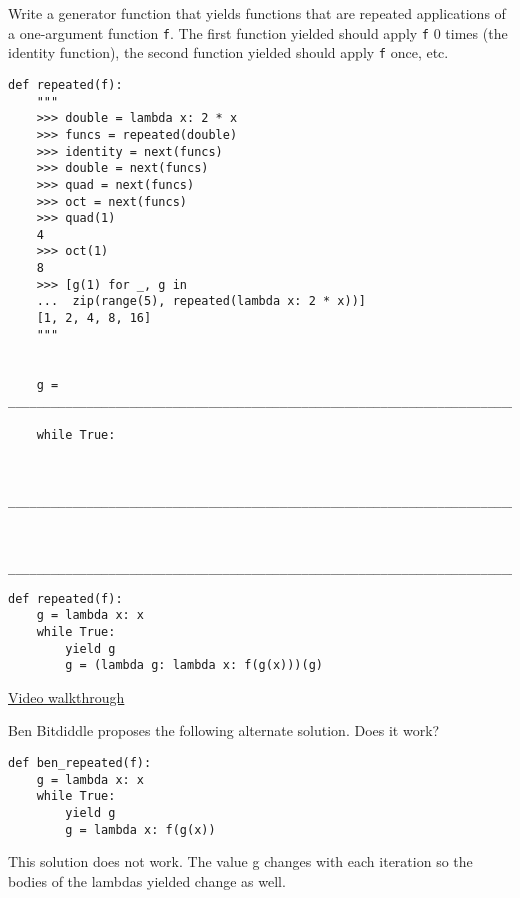 \question Write a generator function that yields functions that are repeated
applications of a one-argument function \texttt{f}. The first function yielded
should apply \texttt{f} 0 times (the identity function), the second function
yielded should apply \texttt{f} once, etc.

\begin{lstlisting}
def repeated(f):
    """
    >>> double = lambda x: 2 * x
    >>> funcs = repeated(double)
    >>> identity = next(funcs)
    >>> double = next(funcs)
    >>> quad = next(funcs)
    >>> oct = next(funcs)
    >>> quad(1)
    4
    >>> oct(1)
    8
    >>> [g(1) for _, g in
    ...  zip(range(5), repeated(lambda x: 2 * x))]
    [1, 2, 4, 8, 16]
    """


    g = ________________________________________________________________________

    while True:


        ________________________________________________________________________


        ________________________________________________________________________
\end{lstlisting}
\begin{solution}
\begin{lstlisting}
def repeated(f):
    g = lambda x: x
    while True:
        yield g
        g = (lambda g: lambda x: f(g(x)))(g)
\end{lstlisting}
\href{https://youtu.be/I-riLb8xAdk}{Video walkthrough}
\end{solution}

\question Ben Bitdiddle proposes the following alternate solution. Does it work?

\begin{lstlisting}
def ben_repeated(f):
    g = lambda x: x
    while True:
        yield g
        g = lambda x: f(g(x))
\end{lstlisting}
\begin{solution}
This solution does not work. The value g changes with each iteration so the bodies
of the lambdas yielded change as well.
\end{solution}
